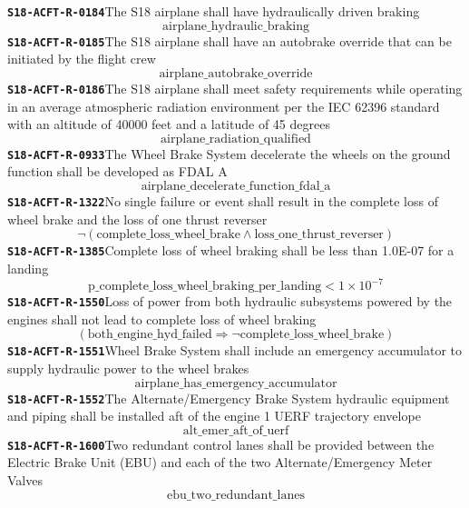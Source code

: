 \documentclass[11pt,a4paper]{article}
\begin{document}
\noindent\textbf{\texttt{S18-ACFT-R-0184}}\quad The S18 airplane shall have hydraulically driven braking
\begin{dmath*}
\text{airplane\_hydraulic\_braking}
\end{dmath*}
\noindent\textbf{\texttt{S18-ACFT-R-0185}}\quad The S18 airplane shall have an autobrake override that can be initiated by the flight crew
\begin{dmath*}
\text{airplane\_autobrake\_override}
\end{dmath*}
\noindent\textbf{\texttt{S18-ACFT-R-0186}}\quad The S18 airplane shall meet safety requirements while operating in an average atmospheric radiation environment per the IEC 62396 standard with an altitude of 40000 feet and a latitude of 45 degrees
\begin{dmath*}
\text{airplane\_radiation\_qualified}
\end{dmath*}
\noindent\textbf{\texttt{S18-ACFT-R-0933}}\quad The Wheel Brake System decelerate the wheels on the ground function shall be developed as FDAL A
\begin{dmath*}
\text{airplane\_decelerate\_function\_fdal\_a}
\end{dmath*}
\noindent\textbf{\texttt{S18-ACFT-R-1322}}\quad No single failure or event shall result in the complete loss of wheel brake and the loss of one thrust reverser
\begin{dmath*}
\neg (\text{complete\_loss\_wheel\_brake} \wedge \text{loss\_one\_thrust\_reverser})
\end{dmath*}
\noindent\textbf{\texttt{S18-ACFT-R-1385}}\quad Complete loss of wheel braking shall be less than 1.0E-07 for a landing
\begin{dmath*}
\text{p\_complete\_loss\_wheel\_braking\_per\_landing} < 1 \times 10^{-7}
\end{dmath*}
\noindent\textbf{\texttt{S18-ACFT-R-1550}}\quad Loss of power from both hydraulic subsystems powered by the engines shall not lead to complete loss of wheel braking
\begin{dmath*}
(\text{both\_engine\_hyd\_failed} \Rightarrow \neg \text{complete\_loss\_wheel\_brake})
\end{dmath*}
\noindent\textbf{\texttt{S18-ACFT-R-1551}}\quad Wheel Brake System shall include an emergency accumulator to supply hydraulic power to the wheel brakes
\begin{dmath*}
\text{airplane\_has\_emergency\_accumulator}
\end{dmath*}
\noindent\textbf{\texttt{S18-ACFT-R-1552}}\quad The Alternate/Emergency Brake System hydraulic equipment and piping shall be installed aft of the engine 1 UERF trajectory envelope
\begin{dmath*}
\text{alt\_emer\_aft\_of\_uerf}
\end{dmath*}
\noindent\textbf{\texttt{S18-ACFT-R-1600}}\quad Two redundant control lanes shall be provided between the Electric Brake Unit (EBU) and each of the two Alternate/Emergency Meter Valves
\begin{dmath*}
\text{ebu\_two\_redundant\_lanes}
\end{dmath*}
\end{document}
